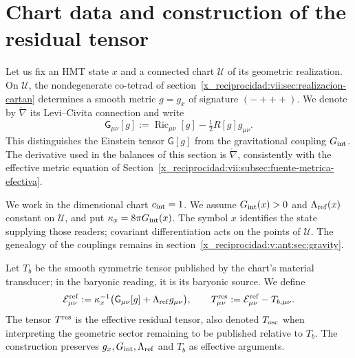 \section{Chart data and construction of the residual tensor}
\label{x_reciprocidad:vii:subsec:datos-tensor-residual}

Let us fix an HMT state \(x\) and a connected chart \(\mathcal U\) of its
geometric realization. On \(\mathcal U\), the nondegenerate co-tetrad
of section~\ref{x_reciprocidad:vii:sec:realizacion-cartan} determines a smooth metric
\(g=g_x\) of signature \((-+++)\). We denote by
\(\mathring\nabla\) its Levi--Civita connection and write
\[
 \mathsf G_{\mu\nu}[g]
 :=\operatorname{Ric}_{\mu\nu}[g]-\tfrac12R[g]g_{\mu\nu}.
\]
This distinguishes the Einstein tensor \(\mathsf G[g]\) from
the gravitational coupling \(G_{\rm int}\). The derivative used
in the balances of this section is \(\mathring\nabla\),
consistently with the effective metric equation of
Section~\ref{x_reciprocidad:vii:subsec:fuente-metrica-efectiva}.

We work in the dimensional chart \(c_{\rm int}=1\). We assume
\(G_{\rm int}(x)>0\) and \(\Lambda_{\rm ref}(x)\) constant on
\(\mathcal U\), and put \(\kappa_x=8\pi G_{\rm int}(x)\).
The symbol \(x\) identifies the state supplying those readers;
covariant differentiation acts on the points of \(\mathcal U\).
The genealogy of the couplings remains in
section~\ref{x_reciprocidad:v:ant:sec:gravity}.

Let \(T_b\) be the smooth symmetric tensor published by the chart's material
transducer; in the baryonic reading, it is its baryonic source. We define
\begin{equation}
 \mathcal E^{\rm ref}_{\mu\nu}
 :=\kappa_x^{-1}\bigl(\mathsf G_{\mu\nu}[g]
                            +\Lambda_{\rm ref}g_{\mu\nu}\bigr),
 \qquad
 T^{\rm res}_{\mu\nu}:=\mathcal E^{\rm ref}_{\mu\nu}-T_{b,\mu\nu}.
 \label{x_reciprocidad:vii:eq:residual-definicion}
\end{equation}
The tensor \(T^{\rm res}\) is the effective residual tensor, also
denoted \(T_{\rm osc}\) when interpreting the geometric sector remaining
to be published relative to \(T_b\). The construction preserves
\(g_x,G_{\rm int},\Lambda_{\rm ref}\) and \(T_b\) as effective arguments.

